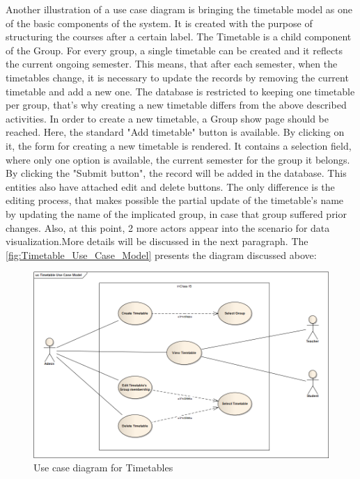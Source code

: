 Another illustration of a use case diagram is bringing the timetable model as one of the basic components of the system. It is created with the purpose of structuring the courses after a certain label. The Timetable is a child component of the Group. For every group, a single timetable can be created and it reflects the current ongoing semester. This means, that after each semester, when the timetables change, it is necessary to update the records by removing the current timetable and add a new one. The database is restricted to keeping one timetable per group, that's why creating a new timetable differs from the above described activities. In order to create a new timetable, a Group show page should be reached. Here, the standard "Add timetable" button is available. By clicking on it, the form for creating a new timetable is rendered. It contains a selection field, where only one option is available, the current semester for the group it belongs. By clicking the "Submit button", the record will be added in the database. This entities also have attached edit and delete buttons. The only difference is the editing process, that makes possible the partial update of the timetable's name by updating the name of the implicated group, in case that group suffered prior changes. Also, at this point, 2 more actors appear into the scenario for data visualization.More details will be discussed in the next paragraph. The \autoref{fig:Timetable_Use_Case_Model} presents the diagram discussed above:

\begin{figure}[H]
\centering
\includegraphics[width=14cm]{Chapter2/Timetable_Use_Case_Model.png}
\caption{Use case diagram for Timetables}
\label{fig:Timetable_Use_Case_Model}
\end{figure}

